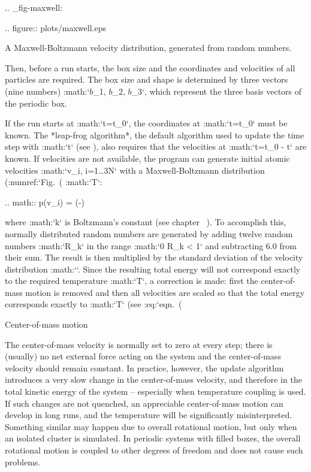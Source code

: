 .. _fig-maxwell:

.. figure:: plots/maxwell.eps

   A Maxwell-Boltzmann velocity distribution, generated from
   random numbers.

Then, before a run starts, the box size and the coordinates and
velocities of all particles are required. The box size and shape is
determined by three vectors (nine numbers)
:math:`{\mbox{\boldmath ${b}$}}_1, {\mbox{\boldmath ${b}$}}_2, {\mbox{\boldmath ${b}$}}_3`,
which represent the three basis vectors of the periodic box.

If the run starts at :math:`t=t_0`, the coordinates at :math:`t=t_0`
must be known. The *leap-frog algorithm*, the default algorithm used to
update the time step with :math:`{{\Delta t}}` (see
), also requires that the velocities at
:math:`t=t_0 - {{}{{\Delta t}}}` are known. If velocities are
not available, the program can generate initial atomic velocities
:math:`v_i, i=1\ldots 3N` with a Maxwell-Boltzmann distribution
(:numref:`Fig. (%
:math:`T`:

.. math:: p(v_i) = \exp\left(-\right)

where :math:`k` is Boltzmann’s constant (see
chapter 
). To accomplish this, normally
distributed random numbers are generated by adding twelve random numbers
:math:`R_k` in the range :math:`0 \le R_k < 1` and subtracting 6.0 from
their sum. The result is then multiplied by the standard deviation of
the velocity distribution :math:``. Since the resulting
total energy will not correspond exactly to the required temperature
:math:`T`, a correction is made: first the center-of-mass motion is
removed and then all velocities are scaled so that the total energy
corresponds exactly to :math:`T` (see :eq:`eqn. (%

Center-of-mass motion
^^^^^^^^^^^^^^^^^^^^^

The center-of-mass
velocity
is normally set to zero at every step; there is (usually) no net
external force acting on the system and the center-of-mass velocity
should remain constant. In practice, however, the update algorithm
introduces a very slow change in the center-of-mass velocity, and
therefore in the total kinetic energy of the system – especially when
temperature coupling is used. If such changes are not quenched, an
appreciable center-of-mass motion can develop in long runs, and the
temperature will be significantly misinterpreted. Something similar may
happen due to overall rotational motion, but only when an isolated
cluster is simulated. In periodic systems with filled boxes, the overall
rotational motion is coupled to other degrees of freedom and does not
cause such problems.

